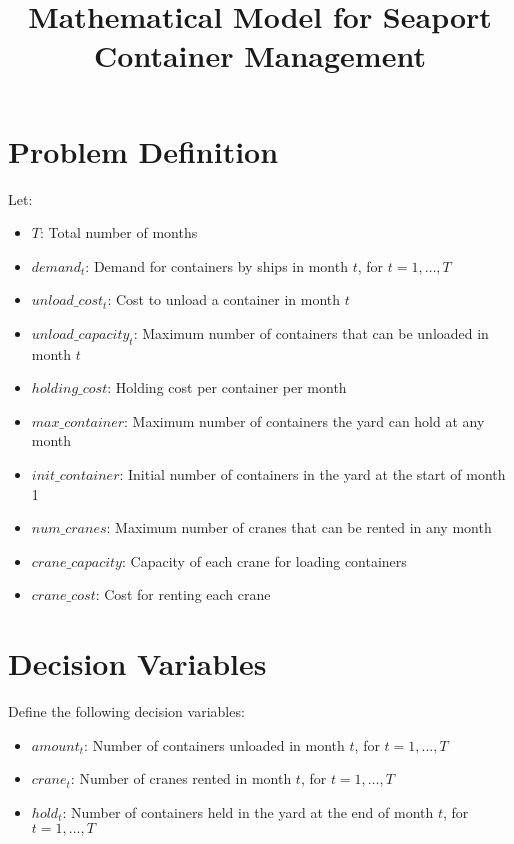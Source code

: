 \documentclass{article}
\begin{document}
\title{Mathematical Model for Seaport Container Management}
\author{}
\date{}
\maketitle

\section*{Problem Definition}

Let:
\begin{itemize}
    \item $T$: Total number of months
    \item $demand_t$: Demand for containers by ships in month $t$, for $t = 1, \ldots, T$
    \item $unload\_cost_t$: Cost to unload a container in month $t$
    \item $unload\_capacity_t$: Maximum number of containers that can be unloaded in month $t$
    \item $holding\_cost$: Holding cost per container per month
    \item $max\_container$: Maximum number of containers the yard can hold at any month
    \item $init\_container$: Initial number of containers in the yard at the start of month 1
    \item $num\_cranes$: Maximum number of cranes that can be rented in any month
    \item $crane\_capacity$: Capacity of each crane for loading containers
    \item $crane\_cost$: Cost for renting each crane
\end{itemize}

\section*{Decision Variables}
Define the following decision variables:
\begin{itemize}
    \item $amount_t$: Number of containers unloaded in month $t$, for $t = 1, \ldots, T$
    \item $crane_t$: Number of cranes rented in month $t$, for $t = 1, \ldots, T$
    \item $hold_t$: Number of containers held in the yard at the end of month $t$, for $t = 1, \ldots, T$
\end{itemize}
\end{document}
